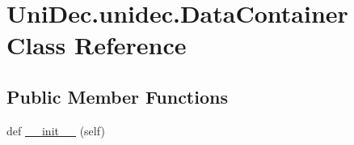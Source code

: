 \hypertarget{class_uni_dec_1_1unidec_1_1_data_container}{}\section{Uni\+Dec.\+unidec.\+Data\+Container Class Reference}
\label{class_uni_dec_1_1unidec_1_1_data_container}
\subsection*{Public Member Functions}
\begin{DoxyCompactItemize}
\item 
def \hyperlink{class_uni_dec_1_1unidec_1_1_data_container_acd6b24fe46d315e0a69f7db134f347ea}{\+\_\+\+\_\+init\+\_\+\+\_\+} (self)
\end{DoxyCompactItemize}

